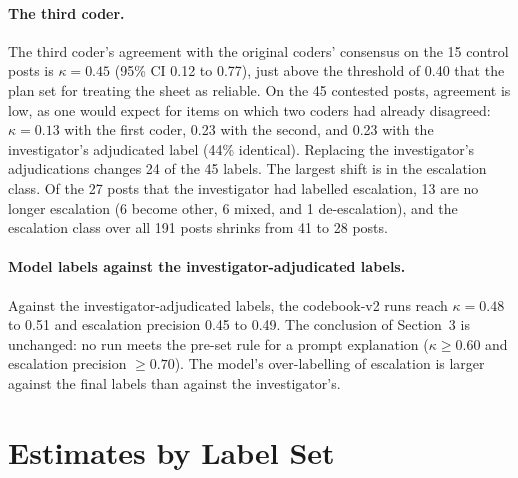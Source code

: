 \documentclass[11pt]{article}
\begin{document}
\paragraph{The third coder.} The third coder's agreement with the original coders' consensus on the 15 control posts is $\kappa = 0.45$ (95\% CI 0.12 to 0.77), just above the threshold of 0.40 that the plan set for treating the sheet as reliable. On the 45 contested posts, agreement is low, as one would expect for items on which two coders had already disagreed: $\kappa = 0.13$ with the first coder, 0.23 with the second, and 0.23 with the investigator's adjudicated label (44\% identical). Replacing the investigator's adjudications changes 24 of the 45 labels. The largest shift is in the escalation class. Of the 27 posts that the investigator had labelled escalation, 13 are no longer escalation (6 become other, 6 mixed, and 1 de-escalation), and the escalation class over all 191 posts shrinks from 41 to 28 posts.

\paragraph{Model labels against the investigator-adjudicated labels.} Against the investigator-adjudicated labels, the codebook-v2 runs reach $\kappa = 0.48$ to 0.51 and escalation precision 0.45 to 0.49. The conclusion of Section~3 is unchanged: no run meets the pre-set rule for a prompt explanation ($\kappa \geq 0.60$ and escalation precision $\geq 0.70$). The model's over-labelling of escalation is larger against the final labels than against the investigator's.

\section{Estimates by Label Set}
\label{sec:labelsets}
\end{document}
